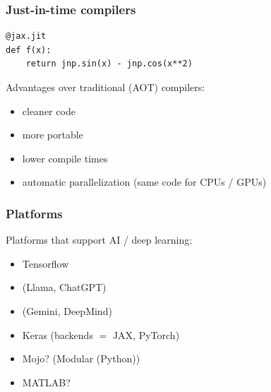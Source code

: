\begin{frame}[fragile]
    \frametitle{Just-in-time compilers}

    \vspace{0.5em}
    
    \begin{verbatim}
@jax.jit
def f(x):
    return jnp.sin(x) - jnp.cos(x**2)
    \end{verbatim}

    \vspace{0.5em}
    \vspace{0.5em}
    Advantages over traditional (AOT) compilers:

    \begin{itemize}
        \item cleaner code
    \vspace{0.5em}
        \item more portable
    \vspace{0.5em}
        \item lower compile times
    \vspace{0.5em}
        \item automatic parallelization (same code for CPUs / GPUs)
    \end{itemize}

\end{frame}



\begin{frame}
    \frametitle{Platforms}
    
    Platforms that support AI / deep learning:

    \vspace{0.5em}
    \begin{itemize}
        \item Tensorflow
        \vspace{0.5em}
        \item {} (Llama, ChatGPT)
        \vspace{0.5em}
        \item {} (Gemini, DeepMind)
        \vspace{0.5em}
        \item Keras (backends $=$ JAX, PyTorch)
        \vspace{0.5em}
        \item Mojo? (Modular (Python))
        \vspace{0.5em}
        \item MATLAB? 
    \end{itemize}

\end{frame}




